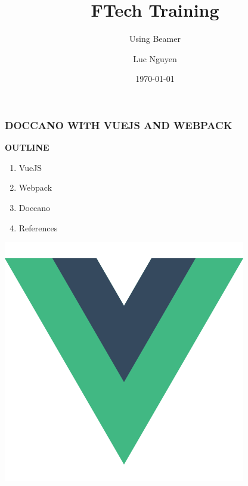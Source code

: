\documentclass[10pt]{beamer}
\title{FTech Training}
\subtitle{Using Beamer}
\author{Luc Nguyen}
\institute{HUST}
\date{\today}
\begin{document}
\begin{frame}
    \frametitle{\textbf{DOCCANO WITH VUEJS AND WEBPACK}}
    \begin{minipage}{0.43\textwidth}
        \Large{\textbf{OUTLINE}}  \\
        \begin{enumerate}
            \item VueJS
            \item Webpack
            \item Doccano
            \item References %
        \end{enumerate}
    \end{minipage}
    \begin{minipage}{0.55\textwidth}
        \includegraphics[scale=0.2]{vue.png}

\end{minipage}
\end{frame}
\end{document}
